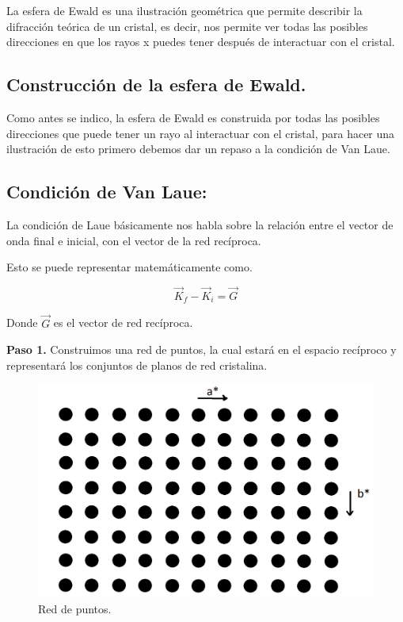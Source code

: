 \documentclass[12pt,a4paper]{article}
\begin{document}
La esfera de Ewald es una ilustración geométrica que permite describir la difracción teórica de un cristal, es decir, nos permite ver todas las posibles direcciones en que los rayos x puedes tener después de interactuar con el cristal. \par

\subsection{Construcción de la esfera de Ewald. }\par

Como antes se indico, la esfera de Ewald es construida por todas las posibles direcciones que puede tener un rayo al interactuar con el cristal, para hacer una ilustración de esto primero debemos dar un repaso a la condición de Van Laue. \par

\subsection{Condición de Van Laue:} La condición de Laue básicamente nos habla sobre la relación entre el vector de onda final e inicial, con el vector de la red recíproca.\par

Esto se puede representar matemáticamente como. \par

\begin{equation*}
    \overrightarrow{K}_{f}- \overrightarrow{K}_{i}= \overrightarrow{G}  
\end{equation*}

Donde  \( \overrightarrow{G} \)  es el vector de red recíproca.\par

\textbf{Paso 1.} Construimos una red de puntos, la cual estará en el espacio recíproco y representará los conjuntos de planos de red cristalina. \par


\begin{figure}[H]
	\centering
		\includegraphics[scale=0.22]{1.png}
		\caption{ Red de puntos.}
\end{figure}
\end{document}
